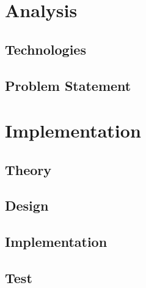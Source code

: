 




 
\tableofcontents



\part{Analysis}






\chapter{Technologies}


\chapter{Problem Statement}



\part{Implementation}

\chapter{Theory}

\chapter{Design}

\chapter{Implementation}


\chapter{Test}


